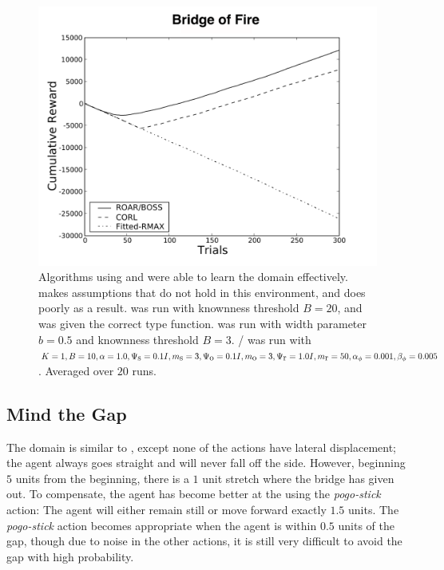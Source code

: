 \begin{figure}[t]
\vskip 0.2in
\begin{center}
\centerline{\includegraphics[width=\columnwidth]{figures/bridgeFigure}}
\caption{Algorithms using  and  were able to learn the  domain effectively.  makes assumptions that do not hold in this environment, and does poorly as a result.  was run with knownness threshold $B=20$, and was given the correct type function.  was run with width parameter $b=0.5$ and knownness threshold $B=3$. / was run with $K=1, B=10, \alpha=1.0,\Psi_{\mbox s}=0.1I, m_{\mbox s}=3, \Psi_{\mbox o}=0.1I, m_{\mbox o}=3, \Psi_{\mbox r}=1.0I,m_{\mbox r}=50,\alpha_\phi=0.001,\beta_\phi=0.005$. Averaged over $20$ runs.}
\label{fig:bridge}
\end{center}
\vskip -0.2in
\end{figure} 

\subsection{Mind the Gap}
\label{gap}

The  domain is similar to , except none of the actions have lateral displacement; the agent always goes straight and will never fall off the side. However, beginning $5$ units from the beginning, there is a $1$ unit stretch where the bridge has given out. To compensate, the agent has become better at the using the \emph{pogo-stick} action: The agent will either remain still or move forward exactly $1.5$ units. The \emph{pogo-stick} action becomes appropriate when the agent is within $0.5$ units of the gap, though due to noise in the other actions, it is still very difficult to avoid the gap with high probability.

